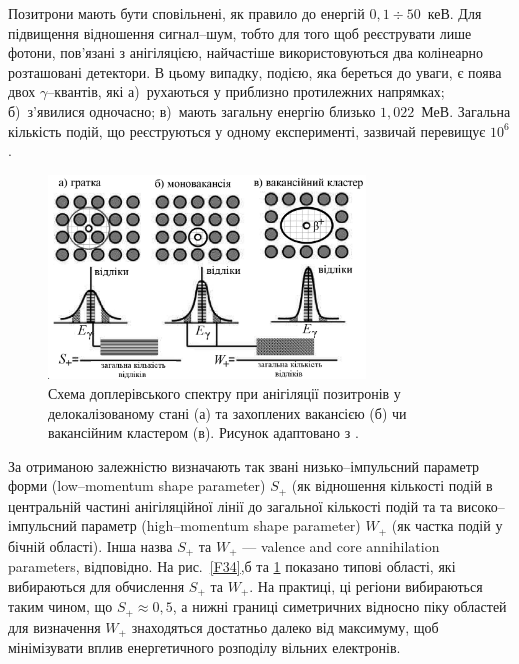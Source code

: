 \documentclass[10pt,a5paper,titlepage,oneside]{book}
\numberwithin{equation}{part}
\begin{document}
Позитрони мають бути сповільнені, як правило до енергій $0,1\div50$~кеВ.
Для підвищення відношення сигнал--шум, тобто для того щоб реєструвати лише фотони, пов'язані з анігіляцією,
найчастіше використовуються два колінеарно розташовані детектори.
В цьому випадку, подією, яка береться до уваги, є поява двох $\gamma$--квантів, які
а)~рухаються у приблизно протилежних напрямках;
б)~з'явилися одночасно;
в)~мають загальну енергію близько $1,022$~МеВ.
Загальна кількість подій, що реєструються у одному експерименті,
зазвичай перевищує $10^6$.

\begin{figure}[!b]
\center
\vspace{-5mm}
\includegraphics[width=0.75\textwidth]{Fig3_5}
\vspace{-3mm}
\caption{Схема доплерівського спектру при анігіляції
позитронів у делокалізованому стані (а) та захоплених вакансією (б) чи вакансійним кластером (в).
Рисунок адаптовано з \cite{Uedono_2014}.
}
\vspace{-3mm}
\label{F35}
\end{figure}

За отриманою залежністю визначають так звані низько--імпульсний параметр форми
(low--momentum shape parameter) $S_+$ (як відношення кількості подій в центральній частині
анігіляційної лінії до загальної кількості подій та
та високо--імпульсний параметр (high--momentum shape parameter) $W_+$ (як частка подій у бічній області).
Інша назва $S_+$ та $W_+$ --- valence and core annihilation parameters, відповідно.
На рис.~\ref{F34},б та \ref{F35} показано типові області, які вибираються для обчислення $S_+$ та $W_+$.
На практиці, ці регіони вибираються таким чином, що $S_+\approx0,5$,
а нижні границі симетричних відносно піку областей для визначення $W_+$ знаходяться достатньо далеко від
максимуму, щоб мінімізувати вплив енергетичного розподілу вільних електронів.
\end{document}
